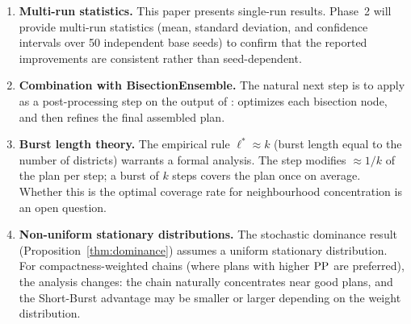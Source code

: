 \begin{enumerate}
\item \textbf{Multi-run statistics.}
      This paper presents single-run results.
      Phase~2 will provide multi-run statistics (mean, standard deviation,
      and confidence intervals over 50 independent base seeds) to confirm
      that the reported improvements are consistent rather than
      seed-dependent.

\item \textbf{Combination with BisectionEnsemble.}
      The natural next step is to apply \shb{} as a post-processing
      step on the output of \be{}: \be{} optimizes each bisection node,
      and \shb{} then refines the final assembled plan.

\item \textbf{Burst length theory.}
      The empirical rule $\ell^* \approx k$ (burst length equal to
      the number of districts) warrants a formal analysis.
      The \recom{} step modifies $\approx 1/k$ of the plan per step;
      a burst of $k$ steps covers the plan once on average.
      Whether this is the optimal coverage rate for neighbourhood
      concentration is an open question.

\item \textbf{Non-uniform stationary distributions.}
      The stochastic dominance result (Proposition~\ref{thm:dominance})
      assumes a uniform stationary distribution.
      For compactness-weighted chains (where plans with higher $\mathrm{PP}$
      are preferred), the analysis changes: the chain naturally
      concentrates near good plans, and the Short-Burst advantage
      may be smaller or larger depending on the weight distribution.
\end{enumerate}
